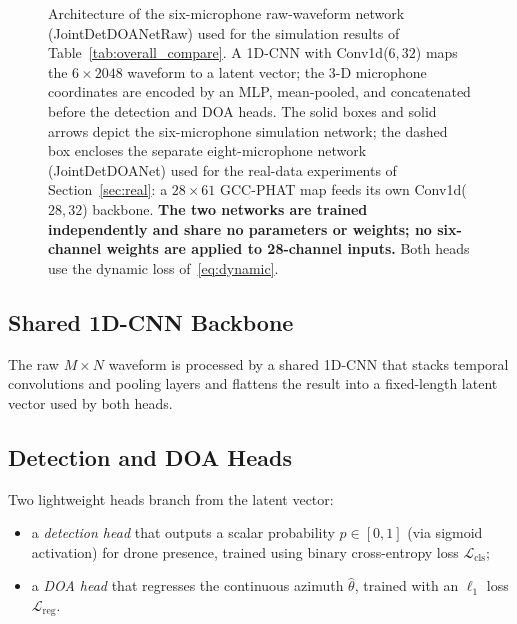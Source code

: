\documentclass[5p,twocolumn]{elsarticle}
\begin{document}
\begin{figure}[t]
\caption{Architecture of the six-microphone raw-waveform network (JointDetDOANetRaw) used for the simulation results of Table~\ref{tab:overall_compare}. A 1D-CNN with Conv1d($6,32$) maps the $6\times2048$ waveform to a latent vector; the 3-D microphone coordinates are encoded by an MLP, mean-pooled, and concatenated before the detection and DOA heads. The solid boxes and solid arrows depict the six-microphone simulation network; the dashed box encloses the separate eight-microphone network (JointDetDOANet) used for the real-data experiments of Section~\ref{sec:real}: a $28\times61$ GCC-PHAT map feeds its own Conv1d($28,32$) backbone. \textbf{The two networks are trained independently and share no parameters or weights; no six-channel weights are applied to 28-channel inputs.} Both heads use the dynamic loss of~\eqref{eq:dynamic}.}
\label{fig:arch}
\end{figure}

\subsection{Shared 1D-CNN Backbone}
The raw $M\times N$ waveform is processed by a shared 1D-CNN that stacks temporal convolutions and pooling layers and flattens the result into a fixed-length latent vector used by both heads.

\subsection{Detection and DOA Heads}
Two lightweight heads branch from the latent vector:
\begin{itemize}
    \item a \emph{detection head} that outputs a scalar probability $p\in[0,1]$ (via sigmoid activation) for drone presence, trained using binary cross-entropy loss $\mathcal{L}_{\mathrm{cls}}$;
    \item a \emph{DOA head} that regresses the continuous azimuth $\hat\theta$, trained with an $\ell_1$ loss $\mathcal{L}_{\mathrm{reg}}$.
\end{itemize}
\end{document}
